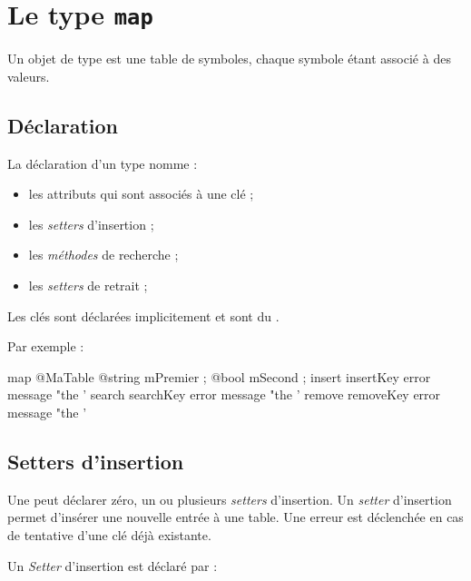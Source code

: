 
\chapter{Le type \texttt{map}}

Un objet de type  est une table de symboles, chaque symbole étant associé à des valeurs.

\section{Déclaration}

La déclaration d'un type  nomme :
\begin{itemize}
  \item les attributs qui sont associés à une clé ;
  \item les \emph{setters} d'insertion ;
  \item les \emph{méthodes} de recherche ;
  \item les \emph{setters} de retrait ;
\end{itemize}

Les clés sont déclarées implicitement et sont du .

Par exemple :

\begin{galgascode}
map @MaTable {
  @string mPremier ;
  @bool mSecond ;
  insert insertKey error message "the '%
  search searchKey error message "the '%
  remove removeKey error message "the '%
}
\end{galgascode}






\section{Setters d'insertion}

Une  peut déclarer zéro, un ou plusieurs \emph{setters} d'insertion. Un \emph{setter} d'insertion permet d'insérer une nouvelle entrée à une table. Une erreur est déclenchée en cas de tentative d'une clé déjà existante.


Un \emph{Setter} d'insertion est déclaré par :

